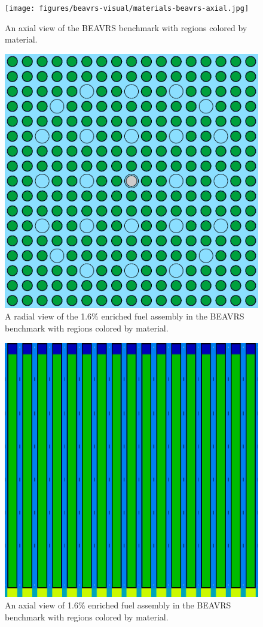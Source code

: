 \begin{figure}[h!]
	\centering
	\texttt{[image: figures/beavrs-visual/materials-beavrs-axial.jpg]}
	\caption{An axial view of the BEAVRS benchmark with regions colored by material.}
	\label{fig:beavrs-materials-axial}
\end{figure} 

\begin{figure}[h!]
	\centering
	\includegraphics[width=0.65\linewidth]{figures/beavrs-visual/materials-single-assembly-radial.png}
	\caption{A radial view of the 1.6\% enriched fuel assembly in the BEAVRS benchmark with regions colored by material.}
	\label{fig:beavrs-single-assembly-materials-radial}
\end{figure} 

\begin{figure}[h!]
	\centering
	\includegraphics[width=0.65\linewidth]{figures/beavrs-visual/materials-single-assembly-axial.png}
	\caption{An axial view of 1.6\% enriched fuel assembly in the BEAVRS benchmark with regions colored by material.}
	\label{fig:beavrs-single-assembly-materials-axial}
\end{figure} 



